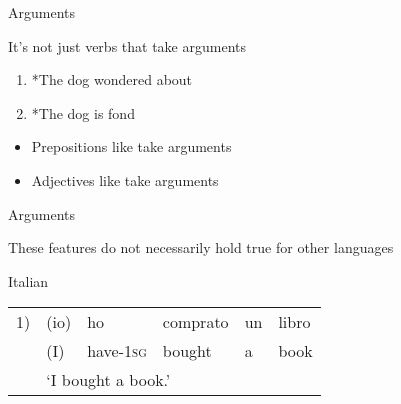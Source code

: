 \documentclass{beamer}
\newcommand{\subonefour}{Arguments}
\begin{document}
      \begin{frame}{\subonefour}
        \begin{block}{}
          It's not just verbs that take arguments
        \end{block}
        \begin{example}
          \begin{enumerate}
            \item *The dog wondered about
            \item *The dog is fond
          \end{enumerate}
        \end{example}
        \begin{block}{}
          \begin{itemize}
            \item Prepositions like  take arguments
            \item Adjectives like  take arguments
          \end{itemize}
        \end{block}
      \end{frame}

      \begin{frame}{\subonefour}
        \begin{alertblock}{}
          These features do not necessarily hold true for other languages
        \end{alertblock}
        \begin{block}{Italian}
          \begin{tabular}{@{} l l l l l l @{}}
            1)  & (io)  & ho                & comprato  & un  & libro \\
                & (I)   & have-\textsc{1sg} & bought    & a   & book \\
                & \multicolumn{5}{l}{`I bought a book.'}
          \end{tabular}
        \end{block}
      \end{frame}
\end{document}
